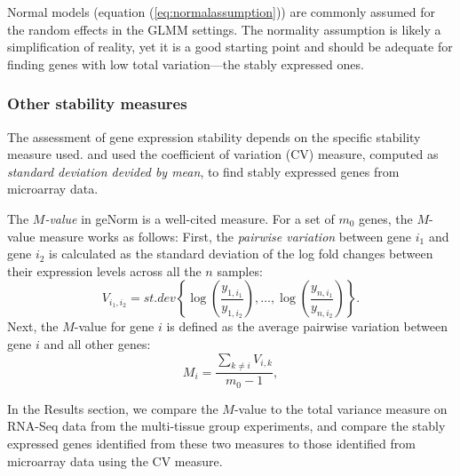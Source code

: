 Normal models (equation (\ref{eq:normalassumption})) are commonly assumed for
the random effects in the GLMM settings. The normality assumption is likely a
simplification of reality, yet it is a good starting point and should be
adequate for finding genes with low total variation---the stably expressed
ones.

\subsubsection{Other stability measures}\label{subsection:OtherStabilityMeasure}
The assessment of gene expression stability depends on the specific stability
measure used. 
\citet{czechowski2005genome} and \citet{dekkers2012identification} used  the
coefficient of variation (CV) measure, computed as \textit{standard
	deviation devided by mean}, to find stably expressed genes from microarray data.


The \textit{$M$-value} in geNorm \citep{vandesompele2002accurate} is a
well-cited measure. For a set of $m_0$ genes, the $M$-value measure works as
follows: First, the {\em pairwise variation} between gene $i_1$ and gene $i_2$ is
calculated as the standard deviation of the log fold changes between their
expression levels across all the $n$ samples: 
\[V_{i_1, i_2} =\textit{st.dev}
\left\{\log\left(\dfrac{y_{1,i_1}}{y_{1, i_2}}\right),\ldots,
\log\left(\dfrac{y_{n, i_1}}{y_{n, i_2}}\right) \right\}.\]
Next, the $M$-value for gene $i$ is defined as the average pairwise
variation between gene $i$ and all other genes:
\[M_{i} = \frac{\sum_{k\neq i}V_{i, k}}{m_0-1},\] 


In the Results section, we compare the $M$-value to the total variance measure
on RNA-Seq data from the multi-tissue group experiments, and compare the
stably expressed genes identified from these two measures to those identified
from microarray data using the CV measure.

